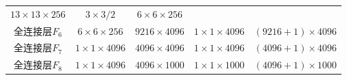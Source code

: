\documentclass[12pt,a4paper,UTF8,twoside]{book}
\begin{document}
\begin{longtable}[]{@{}ccccc@{}}
\begin{minipage}[t]{0.17\columnwidth}
\(13\times13\times256\)\strut
\end{minipage} & \begin{minipage}[t]{0.17\columnwidth}\centering
\(3\times3/2\)\strut
\end{minipage} & \begin{minipage}[t]{0.17\columnwidth}\centering
\(6\times6\times256\)\strut
\end{minipage} & \begin{minipage}[t]{0.17\columnwidth}\centering
0\strut
\end{minipage}\tabularnewline
\begin{minipage}[t]{0.17\columnwidth}\centering
全连接层\(F_6\)\strut
\end{minipage} & \begin{minipage}[t]{0.17\columnwidth}\centering
\(6\times6\times256\)\strut
\end{minipage} & \begin{minipage}[t]{0.17\columnwidth}\centering
\(9216\times4096\)\strut
\end{minipage} & \begin{minipage}[t]{0.17\columnwidth}\centering
\(1\times1\times4096\)\strut
\end{minipage} & \begin{minipage}[t]{0.17\columnwidth}\centering
\((9216+1)\times4096\)\strut
\end{minipage}\tabularnewline
\begin{minipage}[t]{0.17\columnwidth}\centering
全连接层\(F_7\)\strut
\end{minipage} & \begin{minipage}[t]{0.17\columnwidth}\centering
\(1\times1\times4096\)\strut
\end{minipage} & \begin{minipage}[t]{0.17\columnwidth}\centering
\(4096\times4096\)\strut
\end{minipage} & \begin{minipage}[t]{0.17\columnwidth}\centering
\(1\times1\times4096\)\strut
\end{minipage} & \begin{minipage}[t]{0.17\columnwidth}\centering
\((4096+1)\times4096\)\strut
\end{minipage}\tabularnewline
\begin{minipage}[t]{0.17\columnwidth}\centering
全连接层\(F_8\)\strut
\end{minipage} & \begin{minipage}[t]{0.17\columnwidth}\centering
\(1\times1\times4096\)\strut
\end{minipage} & \begin{minipage}[t]{0.17\columnwidth}\centering
\(4096\times1000\)\strut
\end{minipage} & \begin{minipage}[t]{0.17\columnwidth}\centering
\(1\times1\times1000\)\strut
\end{minipage} & \begin{minipage}[t]{0.17\columnwidth}\centering
\((4096+1)\times1000\)\strut
\end{minipage}\tabularnewline
\bottomrule
\end{longtable}
\end{document}

